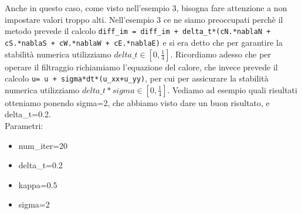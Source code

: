 Anche in questo caso, come visto nell'esempio 3, bisogna fare attenzione a non impostare valori troppo alti. Nell'esempio 3 ce ne siamo preoccupati perchè il metodo prevede il calcolo \texttt{diff\_im = diff\_im + delta\_t*(cN.*nablaN + cS.*nablaS + cW.*nablaW + cE.*nablaE)} e si era detto che per garantire la stabilità numerica utilizziamo $delta\_t \in [0,\frac{1}{4}]$.
Ricordiamo adesso che per operare il filtraggio richiamiamo l'equazione del calore, che invece prevede il calcolo \texttt{u= u + sigma*dt*(u\_{xx}+u\_{yy})}, per cui per assicurare la stabilità numerica utilizziamo $delta\_t*sigma \in[0,\frac{1}{4}]$. Vediamo ad esempio quali risultati otteniamo ponendo sigma=2, che abbiamo visto dare un buon risultato, e delta\_t=0.2.\\
Parametri:
\begin{itemize}
    \item num\_iter=20
    \item delta\_t=0.2
    \item kappa=0.5
    \item sigma=2
\end{itemize}

